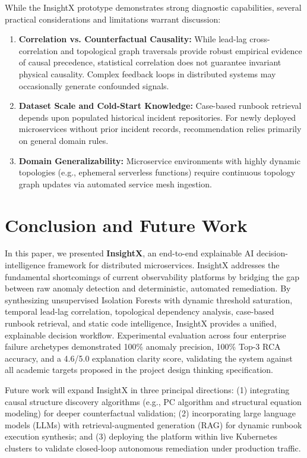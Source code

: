\documentclass[conference]{IEEEtran}
\begin{document}
While the InsightX prototype demonstrates strong diagnostic capabilities, several practical considerations and limitations warrant discussion:
\begin{enumerate}
    \item \textbf{Correlation vs. Counterfactual Causality:} While lead-lag cross-correlation and topological graph traversals provide robust empirical evidence of causal precedence, statistical correlation does not guarantee invariant physical causality. Complex feedback loops in distributed systems may occasionally generate confounded signals.
    \item \textbf{Dataset Scale and Cold-Start Knowledge:} Case-based runbook retrieval depends upon populated historical incident repositories. For newly deployed microservices without prior incident records, recommendation relies primarily on general domain rules.
    \item \textbf{Domain Generalizability:} Microservice environments with highly dynamic topologies (e.g., ephemeral serverless functions) require continuous topology graph updates via automated service mesh ingestion.
\end{enumerate}

\section{Conclusion and Future Work}
In this paper, we presented \textbf{InsightX}, an end-to-end explainable AI decision-intelligence framework for distributed microservices. InsightX addresses the fundamental shortcomings of current observability platforms by bridging the gap between raw anomaly detection and deterministic, automated remediation. By synthesizing unsupervised Isolation Forests with dynamic threshold saturation, temporal lead-lag correlation, topological dependency analysis, case-based runbook retrieval, and static code intelligence, InsightX provides a unified, explainable decision workflow. Experimental evaluation across four enterprise failure archetypes demonstrated 100\% anomaly precision, 100\% Top-3 RCA accuracy, and a 4.6/5.0 explanation clarity score, validating the system against all academic targets proposed in the project design thinking specification.

Future work will expand InsightX in three principal directions: (1) integrating causal structure discovery algorithms (e.g., PC algorithm and structural equation modeling) for deeper counterfactual validation; (2) incorporating large language models (LLMs) with retrieval-augmented generation (RAG) for dynamic runbook execution synthesis; and (3) deploying the platform within live Kubernetes clusters to validate closed-loop autonomous remediation under production traffic.
\end{document}
